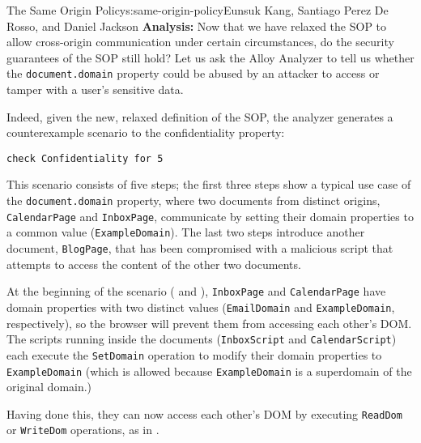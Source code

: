\begin{aosachapter}{The Same Origin Policy}{s:same-origin-policy}{Eunsuk Kang, Santiago Perez De Rosso, and Daniel Jackson}
\textbf{Analysis:} Now that we have relaxed the SOP to allow
cross-origin communication under certain circumstances, do the security
guarantees of the SOP still hold? Let us ask the Alloy Analyzer to tell
us whether the \texttt{document.domain} property could be abused by an
attacker to access or tamper with a user's sensitive data.

Indeed, given the new, relaxed definition of the SOP, the analyzer
generates a counterexample scenario to the confidentiality property:

\begin{verbatim}
check Confidentiality for 5
\end{verbatim}

This scenario consists of five steps; the first three steps show a
typical use case of the \texttt{document.domain} property, where two
documents from distinct origins, \texttt{CalendarPage} and
\texttt{InboxPage}, communicate by setting their domain properties to a
common value (\texttt{ExampleDomain}). The last two steps introduce
another document, \texttt{BlogPage}, that has been compromised with a
malicious script that attempts to access the content of the other two
documents.

At the beginning of the scenario
( and
),
\texttt{InboxPage} and \texttt{CalendarPage} have domain properties with
two distinct values (\texttt{EmailDomain} and \texttt{ExampleDomain},
respectively), so the browser will prevent them from accessing each
other's DOM. The scripts running inside the documents
(\texttt{InboxScript} and \texttt{CalendarScript}) each execute the
\texttt{SetDomain} operation to modify their domain properties to
\texttt{ExampleDomain} (which is allowed because \texttt{ExampleDomain}
is a superdomain of the original domain.)


Having done this, they can now access each other's DOM by executing
\texttt{ReadDom} or \texttt{WriteDom} operations, as in
.



\end{aosachapter}
